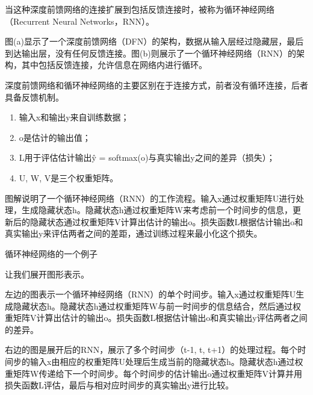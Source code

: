 当这种深度前馈网络的连接扩展到包括反馈连接时，被称为循环神经网络（Recurrent
Neural Networks，RNN）。

图(a)显示了一个深度前馈网络（DFN）的架构，数据从输入层经过隐藏层，最后到达输出层，没有任何反馈连接。图(b)则展示了一个循环神经网络（RNN）的架构，其中包括反馈连接，允许信息在网络内进行循环。


深度前馈网络和循环神经网络的主要区别在于连接方式，前者没有循环连接，后者具备反馈机制。


\begin{enumerate}
\def\labelenumi{\arabic{enumi}.}
\item
  输入x和输出y来自训练数据；
\item
  o是估计的输出值；
\item
  L用于评估估计输出ŷ = softmax(o)与真实输出y之间的差异（损失）；
\item
  U, W, V是三个权重矩阵。
\end{enumerate}

图解说明了一个循环神经网络（RNN）的工作流程。输入x通过权重矩阵U进行处理，生成隐藏状态h。隐藏状态h通过权重矩阵W来考虑前一个时间步的信息，更新后的隐藏状态通过权重矩阵V计算出估计的输出o。损失函数L根据估计输出o和真实输出y来评估两者之间的差距，通过训练过程来最小化这个损失。

循环神经网络的一个例子

让我们展开图形表示。


左边的图表示一个循环神经网络（RNN）的单个时间步。输入x通过权重矩阵U生成隐藏状态h。隐藏状态h通过权重矩阵W与前一时间步的信息结合，然后通过权重矩阵V计算出估计的输出o。损失函数L根据估计输出o和真实输出y评估两者之间的差异。

右边的图是展开后的RNN，展示了多个时间步（t-1, t,
t+1）的处理过程。每个时间步的输入x由相应的权重矩阵U处理后生成当前的隐藏状态h。隐藏状态h通过权重矩阵W传递给下一个时间步。每个时间步的估计输出o通过权重矩阵V计算并用损失函数L评估，最后与相对应时间步的真实输出y进行比较。

